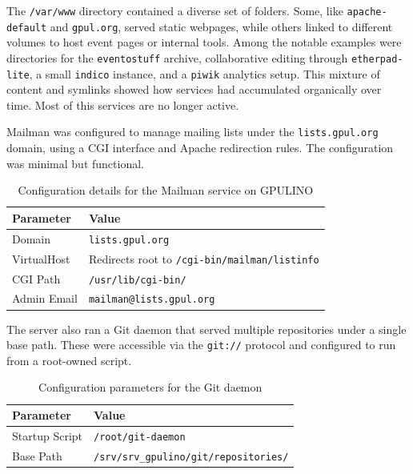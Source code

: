 The \texttt{/var/www} directory contained a diverse set of folders. Some, like \texttt{apache-default} and \texttt{gpul.org}, served static webpages, while others linked to different volumes to host event pages or internal tools. Among the notable examples were directories for the \texttt{eventostuff} archive, collaborative editing through \texttt{etherpad-lite}, a small \texttt{indico} instance, and a \texttt{piwik} analytics setup. This mixture of content and symlinks showed how services had accumulated organically over time. Most of this services are no longer active.

Mailman was configured to manage mailing lists under the \texttt{lists.gpul.org} domain, using a CGI interface and Apache redirection rules. The configuration was minimal but functional.

\begin{table}[H]
  \centering
  \caption{Configuration details for the Mailman service on GPULINO}
  \label{tab:gpulino_mailman}
  \begin{tabular}{ll}
    \rowcolor{udcpink!25}
    \textbf{Parameter} & \textbf{Value} \\
    \hline
    Domain & \texttt{lists.gpul.org} \\
    VirtualHost & Redirects root to \texttt{/cgi-bin/mailman/listinfo} \\
    CGI Path & \texttt{/usr/lib/cgi-bin/} \\
    Admin Email & \texttt{mailman@lists.gpul.org} \\
  \end{tabular}
\end{table}

The server also ran a Git daemon that served multiple repositories under a single base path. These were accessible via the \texttt{git://} protocol and configured to run from a root-owned script.

\begin{table}[H]
  \centering
  \caption{Configuration parameters for the Git daemon}
  \label{tab:gpulino_git_daemon}
  \begin{tabular}{ll}
    \rowcolor{udcpink!25}
    \textbf{Parameter} & \textbf{Value} \\
    \hline
    Startup Script & \texttt{/root/git-daemon} \\
    Base Path & \verb|/srv/srv_gpulino/git/repositories/| \\
  \end{tabular}
\end{table}

